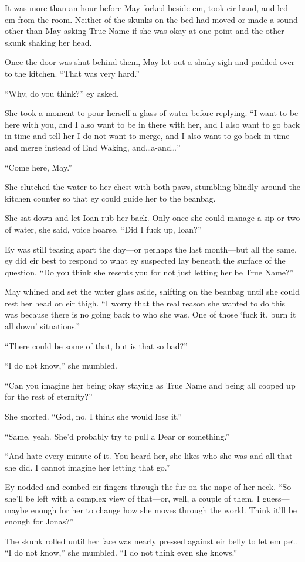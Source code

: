 It was more than an hour before May forked beside em, took eir hand, and led em from the room. Neither of the skunks on the bed had moved or made a sound other than May asking True Name if she was okay at one point and the other skunk shaking her head.

Once the door was shut behind them, May let out a shaky sigh and padded over to the kitchen. ``That was very hard.''

``Why, do you think?'' ey asked.

She took a moment to pour herself a glass of water before replying. ``I want to be here with you, and I also want to be in there with her, and I also want to go back in time and tell her I do not want to merge, and I also want to go back in time and merge instead of End Waking, and\ldots a-and\ldots{}''

``Come here, May.''

She clutched the water to her chest with both paws, stumbling blindly around the kitchen counter so that ey could guide her to the beanbag.

She sat down and let Ioan rub her back. Only once she could manage a sip or two of water, she said, voice hoarse, ``Did I fuck up, Ioan?''

Ey was still teasing apart the day—or perhaps the last month—but all the same, ey did eir best to respond to what ey suspected lay beneath the surface of the question. ``Do you think she resents you for not just letting her be True Name?''

May whined and set the water glass aside, shifting on the beanbag until she could rest her head on eir thigh. ``I worry that the real reason she wanted to do this was because there is no going back to who she was. One of those `fuck it, burn it all down' situations.''

``There could be some of that, but is that so bad?''

``I do not know,'' she mumbled.

``Can you imagine her being okay staying as True Name and being all cooped up for the rest of eternity?''

She snorted. ``God, no. I think she would lose it.''

``Same, yeah. She'd probably try to pull a Dear or something.''

``And hate every minute of it. You heard her, she likes who she was and all that she did. I cannot imagine her letting that go.''

Ey nodded and combed eir fingers through the fur on the nape of her neck. ``So she'll be left with a complex view of that—or, well, a couple of them, I guess—maybe enough for her to change how she moves through the world. Think it'll be enough for Jonas?''

The skunk rolled until her face was nearly pressed against eir belly to let em pet. ``I do not know,'' she mumbled. ``I do not think even she knows.''
